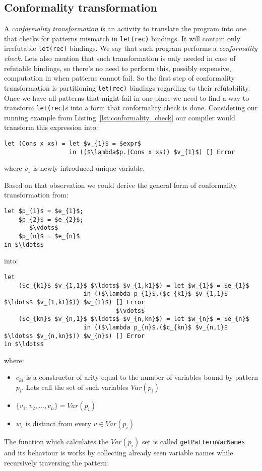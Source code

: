 \documentclass[12pt,a4paper]{report}
\begin{document}
\subsection{Conformality transformation}
\label{sec:conformality_transformation}
A \textit{conformality transformation} is an activity to translate the program
into one that checks for patterns mismatch in \texttt{let(rec)} bindings. It
will contain only irrefutable \texttt{let(rec)} bindings. We say that such
program performs a \textit{conformality check}. Lets also mention that such
transformation is only needed in case of refutable bindings, so there's no need
to perform this, possibly expensive, computation in when patterns cannot fail.
So the first step of conformality transformation is partitioning
\texttt{let(rec)} bindings regarding to their refutability. Once we have all
patterns that might fail in one place we need to find a way to transform
\texttt{let(rec)}s into a form that conformality check is done.  Considering
our running example from Listing~\ref{lst:conformality_check} our compiler
would transform this expression into:

\hspace*{-1.5in}
\begin{lstlisting}[style=haskell,mathescape=true]
let (Cons x xs) = let $v_{1}$ = $expr$
                  in (($\lambda$p.(Cons x xs)) $v_{1}$) [] Error
\end{lstlisting}
where $v_{1}$ is newly introduced unique variable.

Based on that observation we could derive the general form of conformality
transformation from:

\hspace*{-1.5in}
\begin{lstlisting}[style=haskell,mathescape=true]
let $p_{1}$ = $e_{1}$;
    $p_{2}$ = $e_{2}$;
       $\vdots$
    $p_{n}$ = $e_{n}$
in $\ldots$
\end{lstlisting}
into:

\hspace*{-1.5in}
\begin{lstlisting}[style=haskell,mathescape=true]
let
    ($c_{k1}$ $v_{1,1}$ $\ldots$ $v_{1,k1}$) = let $w_{1}$ = $e_{1}$
                      in (($\lambda p_{1}$.($c_{k1}$ $v_{1,1}$ $\ldots$ $v_{1,k1}$)) $w_{1}$) [] Error
                               $\vdots$
    ($c_{kn}$ $v_{n,1}$ $\ldots$ $v_{n,kn}$) = let $w_{n}$ = $e_{n}$
                      in (($\lambda p_{n}$.($c_{kn}$ $v_{n,1}$ $\ldots$ $v_{n,kn}$)) $w_{n}$) [] Error
in $\ldots$
\end{lstlisting}
where:
\begin{itemize}
  \item $c_{ki}$ is a constructor of arity equal to the number of variables
    bound by pattern $p_{i}$. Lets call the set of such variables $Var(p_{i})$
  \item $\{v_1, v_2, \ldots, v_n\} = Var(p_i)$
  \item $w_{i}$ is distinct from every $v \in Var(p_i)$
\end{itemize}
The function which calculates the $Var(p_i)$ set is called
\texttt{getPatternVarNames} and its behaviour is works by collecting already
seen variable names while recursively traversing the pattern:
\end{document}
